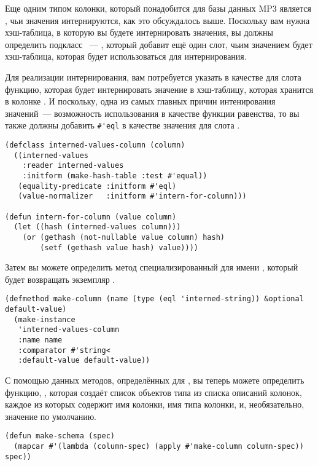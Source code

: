 Еще одним типом колонки, который понадобится для базы данных MP3 является
, чьи значения интернируются, как это обсуждалось выше.  Поскольку
вам нужна хэш-таблица, в которую вы будете интернировать значения, вы должны определить
подкласс ~--- , который добавит ещё один слот,
чьим значением будет хэш-таблица, которая будет использоваться для интернирования.

Для реализации интернирования, вам потребуется указать в качестве  для
слота  функцию, которая будет интернировать значение в хэш-таблицу,
которая хранится в колонке .  И поскольку, одна из самых главных
причин интенирования значений~--- возможность использования  в качестве функции
равенства, то вы также должны добавить \lstinline!#'eql! в качестве значения 
для слота .

\begin{lstlisting}
(defclass interned-values-column (column)
  ((interned-values
    :reader interned-values
    :initform (make-hash-table :test #'equal))
   (equality-predicate :initform #'eql)
   (value-normalizer   :initform #'intern-for-column)))

(defun intern-for-column (value column)
  (let ((hash (interned-values column)))
    (or (gethash (not-nullable value column) hash)
        (setf (gethash value hash) value))))
\end{lstlisting}

Затем вы можете определить метод  специализированный для имени
, который будет возвращать экземпляр .

\begin{lstlisting}
(defmethod make-column (name (type (eql 'interned-string)) &optional default-value)
  (make-instance 
   'interned-values-column
   :name name
   :comparator #'string< 
   :default-value default-value))
\end{lstlisting}

С помощью данных методов, определённых для , вы теперь можете определить
функцию, , которая создаёт список объектов типа  из списка
описаний колонок, каждое из которых содержит имя колонки, имя типа колонки, и,
необязательно, значение по умолчанию.

\begin{lstlisting}
(defun make-schema (spec)
  (mapcar #'(lambda (column-spec) (apply #'make-column column-spec)) spec))
\end{lstlisting}

